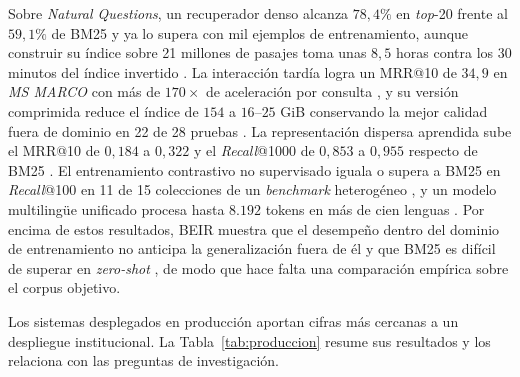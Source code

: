 \documentclass[11pt,letterpaper]{article}
\numberwithin{equation}{section}
\begin{document}
Sobre \textit{Natural Questions}, un recuperador denso alcanza $78{,}4\%$ en \textit{top}-20 frente al $59{,}1\%$ de BM25 y ya lo supera con mil ejemplos de entrenamiento, aunque construir su índice sobre 21 millones de pasajes toma unas $8{,}5$ horas contra los $30$ minutos del índice invertido \cite{karpukhin2020dpr}. La interacción tardía logra un MRR@10 de $34{,}9$ en \textit{MS MARCO} con más de $170\times$ de aceleración por consulta \cite{khattab2020colbert}, y su versión comprimida reduce el índice de $154$ a $16$--$25$ GiB conservando la mejor calidad fuera de dominio en 22 de 28 pruebas \cite{santhanam2022colbertv2}. La representación dispersa aprendida sube el MRR@10 de $0{,}184$ a $0{,}322$ y el \textit{Recall}@1000 de $0{,}853$ a $0{,}955$ respecto de BM25 \cite{formal2021splade}. El entrenamiento contrastivo no supervisado iguala o supera a BM25 en \textit{Recall}@100 en 11 de 15 colecciones de un \textit{benchmark} heterogéneo \cite{izacard2022contriever}, y un modelo multilingüe unificado procesa hasta $8.192$ tokens en más de cien lenguas \cite{chen2024m3}. Por encima de estos resultados, BEIR muestra que el desempeño dentro del dominio de entrenamiento no anticipa la generalización fuera de él y que BM25 es difícil de superar en \textit{zero-shot} \cite{thakur2021beir}, de modo que hace falta una comparación empírica sobre el corpus objetivo.

Los sistemas desplegados en producción aportan cifras más cercanas a un despliegue institucional. La Tabla~\ref{tab:produccion} resume sus resultados y los relaciona con las preguntas de investigación.
\end{document}
